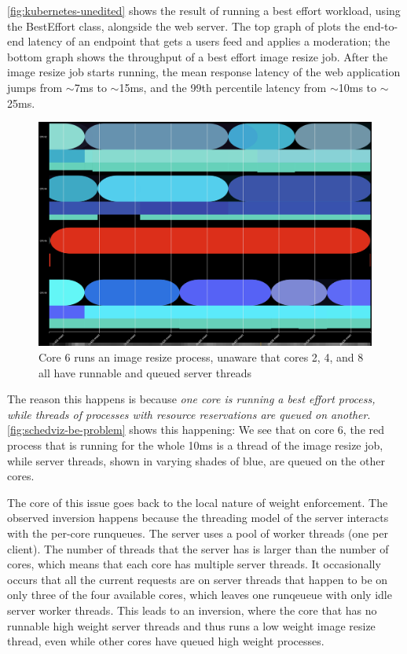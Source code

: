 \autoref{fig:kubernetes-unedited} shows the result of running a best effort
workload, using the BestEffort class, alongside the web server. The top graph of
plots the end-to-end latency of an endpoint that gets a users feed and applies a
moderation; the bottom graph shows the throughput of a best effort image resize
job. After the image resize job starts running, the mean response latency of the
web application jumps from $\sim$7ms to $\sim$15ms, and the 99th percentile
latency from $\sim$10ms to $\sim$25ms.


\begin{figure}[t]
    \centering
    \includegraphics[width=\columnwidth]{graphs/schedviz-be-problem.png}
    \caption{Core 6 runs an image resize process, unaware that cores 2, 4, and 8
    all have runnable and queued server threads}\label{fig:schedviz-be-problem}
\end{figure}

The reason this happens is because \textit{one core is running a best effort
process, while threads of processes with resource reservations are queued on
another}. \autoref{fig:schedviz-be-problem} shows this happening: We see that on
core 6, the red process that is running for the whole 10ms is a thread of the
image resize job, while server threads, shown in varying shades of blue, are
queued on the other cores. 

The core of this issue goes back to the local nature of \cgroups{} weight
enforcement. The observed inversion happens because the threading model of the
server interacts with the per-core runqueues. The server uses a pool of worker
threads (one per client). The number of threads that the server has is larger
than the number of cores, which means that each core has multiple server
threads. It occasionally occurs that all the current requests are on server
threads that happen to be on only three of the four available cores, which
leaves one runqeueue with only idle server worker threads. This leads to an
inversion, where the core that has no runnable high weight server threads and
thus runs a low weight image resize thread, even while other cores have queued
high weight processes.

